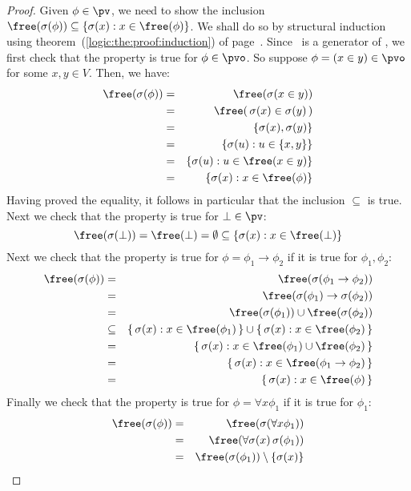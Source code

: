 \begin{proof}
Given $\phi\in\pv$, we need to show the inclusion
$\free(\sigma(\phi))\subseteq\{\sigma(x):x\in\free(\phi)\}$. We
shall do so by structural induction using
theorem~(\ref{logic:the:proof:induction}) of
page~\pageref{logic:the:proof:induction}. Since \pvo\ is a generator
of \pv, we first check that the property is true for $\phi\in\pvo$.
So suppose $\phi=(x\in y)\in\pvo$ for some $x,y\in V$. Then, we
have:
    \begin{eqnarray*}
    \free(\sigma(\phi))&=&\free(\sigma(x\in y))\\
    &=&\free(\,\sigma(x)\in\sigma(y)\,)\\
    &=&\{\sigma(x),\sigma(y)\}\\
    &=&\{\sigma(u):u\in\{x,y\}\}\\
    &=&\{\sigma(u):u\in\free(x\in y)\}\\
    &=&\{\sigma(x):x\in\free(\phi)\}
    \end{eqnarray*}
Having proved the equality, it follows in particular that the
inclusion $\subseteq$ is true. Next we check that the property is
true for $\bot\in\pv$:
    \[
    \free(\sigma(\bot))=\free(\bot)=\emptyset\subseteq\{\sigma(x):x\in\free(\bot)\}
    \]
Next we check that the property is true for
$\phi=\phi_{1}\to\phi_{2}$ if it is true for $\phi_{1},\phi_{2}$:
    \begin{eqnarray*}
    \free(\sigma(\phi))&=&\free(\sigma(\phi_{1}\to\phi_{2}))\\
    &=&\free(\sigma(\phi_{1})\to\sigma(\phi_{2}))\\
    &=&\free(\sigma(\phi_{1}))\cup\free(\sigma(\phi_{2}))\\
    &\subseteq&\{\,\sigma(x):x\in\free(\phi_{1})\,\}\cup\{\,\sigma(x):x\in\free(\phi_{2})\,\}\\
    &=&\{\,\sigma(x):x\in\free(\phi_{1})\cup\free(\phi_{2})\,\}\\
    &=&\{\,\sigma(x):x\in\free(\phi_{1}\to\phi_{2})\,\}\\
    &=&\{\,\sigma(x):x\in\free(\phi)\,\}
    \end{eqnarray*}
Finally we check that the property is true for $\phi=\forall
x\phi_{1}$ if it is true for $\phi_{1}$:
    \begin{eqnarray*}
    \free(\sigma(\phi))&=&\free(\sigma(\forall x\phi_{1}))\\
    &=&\free(\forall\sigma(x)\,\sigma(\phi_{1}))\\
    &=&\free(\sigma(\phi_{1}))\setminus\{\sigma(x)\}\\

\end{eqnarray*}
\end{proof}
